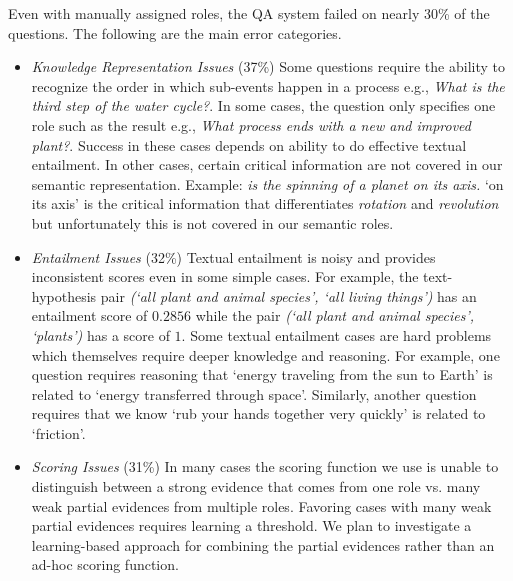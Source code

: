 Even with manually assigned roles, the QA system failed on nearly 30\% of the questions. 
The following are the main error categories.
\begin{itemize}[noitemsep,nolistsep]
\item {\em Knowledge Representation Issues} (37\%)
Some questions require the ability to recognize the order in which sub-events happen in a process e.g., {\em What is the third step of the water cycle?}.
In some cases, the question only specifies one role such as the result e.g., {\em What process ends with a new and improved plant?}. Success in these cases depends on ability to do effective textual entailment. 
In other cases, certain critical information are not covered in our semantic representation. 
Example: {\em \underline{\hspace{1cm}} is the spinning of a planet on its axis.} `on its axis' is the critical information that differentiates {\em rotation} and {\em revolution} but unfortunately this is not covered in our semantic roles.
\item {\em Entailment Issues} (32\%)
Textual entailment is noisy and provides inconsistent scores even in some simple cases. For example, the text-hypothesis pair {\em(`all plant and animal species', `all living things')} has an entailment score of $0.2856$ while the pair {\em(`all plant and animal species', `plants')} has a score of $1$.
Some textual entailment cases are hard problems which themselves require deeper knowledge and reasoning. For example, one question requires reasoning that `energy traveling from the sun to Earth' is related to `energy transferred through space'. Similarly, another question requires that we know `rub your hands together very quickly' is related to `friction'.
\item {\em Scoring Issues} (31\%) 
In many cases the scoring function we use is unable to distinguish between a strong evidence that comes from one role vs. many weak partial evidences from multiple roles. 
Favoring cases with many weak partial evidences requires learning a threshold.  
We plan to investigate a learning-based approach for combining the partial evidences rather than an ad-hoc scoring function. 
\end{itemize}